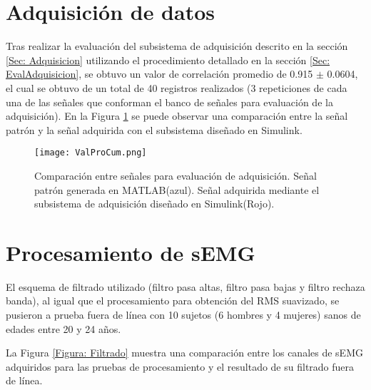 
\section{Adquisición de datos}
Tras realizar la evaluación del subsistema de adquisición descrito en la sección \ref{Sec: Adquisicion} utilizando el procedimiento detallado en la sección \ref{Sec: EvalAdquisicion}, se obtuvo un valor de correlación promedio de 0.915 $\pm$ 0.0604, el cual se obtuvo de un total de 40 registros realizados (3 repeticiones de cada una de las señales que conforman el banco de señales para evaluación de la adquisición). En la Figura \ref{Figura: ValProCum} se puede observar una comparación entre la señal patrón y la señal adquirida con el subsistema diseñado en Simulink\textregistered.



\begin{figure}[htbp]
	\centering
	\texttt{[image: ValProCum.png]}
	\caption[Comparación entre señales para evaluación de adquisición.]{Comparación entre señales para evaluación de adquisición. Señal patrón generada en MATLAB\textregistered (azul). Señal adquirida mediante el subsistema de adquisición diseñado en Simulink\textregistered (Rojo).}
	\label{Figura: ValProCum}
\end{figure}


\section{Procesamiento de sEMG}
El esquema de filtrado utilizado (filtro pasa altas, filtro pasa bajas y filtro rechaza banda), al igual que el procesamiento para obtención del RMS suavizado, se pusieron a prueba fuera de línea con 10 sujetos (6 hombres y 4 mujeres) sanos de edades entre 20 y 24 años.

La Figura \ref{Figura: Filtrado} muestra una comparación entre los canales de sEMG adquiridos para las pruebas de procesamiento y el resultado de su filtrado fuera de línea.

